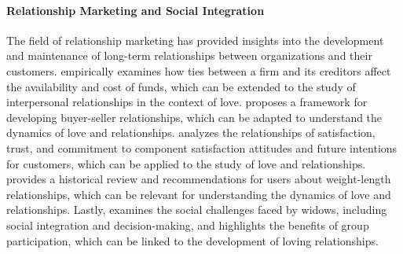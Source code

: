 \paragraph{Relationship Marketing and Social Integration}
The field of relationship marketing has provided insights into the development and maintenance of long-term relationships between organizations and their customers. \citet{petersen1994the} empirically examines how ties between a firm and its creditors affect the availability and cost of funds, which can be extended to the study of interpersonal relationships in the context of love. \citet{dwyer1987developing} proposes a framework for developing buyer-seller relationships, which can be adapted to understand the dynamics of love and relationships. \citet{garbarino1999the} analyzes the relationships of satisfaction, trust, and commitment to component satisfaction attitudes and future intentions for customers, which can be applied to the study of love and relationships. \citet{froese2006cube} provides a historical review and recommendations for users about weight-length relationships, which can be relevant for understanding the dynamics of love and relationships. Lastly, \citet{birech2018the} examines the social challenges faced by widows, including social integration and decision-making, and highlights the benefits of group participation, which can be linked to the development of loving relationships.